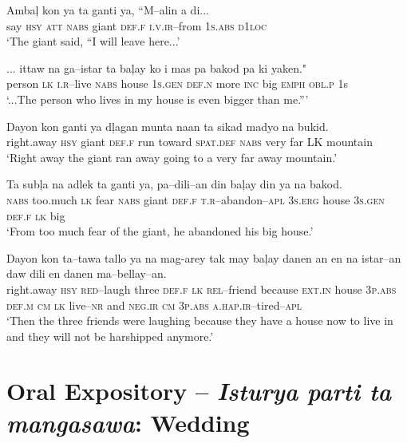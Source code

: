 \ea
\gll  Amba\c{l}  kon  ya  ta  ganti  ya,  ``M--alin  a  di... \\
say  \textsc{hsy}  \textsc{att}  \textsc{nabs}  giant  \textsc{def.f}  \textsc{i.v.ir}--from  1\textsc{s.abs}  \textsc{d1loc} \\
\glt ‘The giant said, “I will leave here...’
\z

\ea
\gll  ... ittaw  na  ga--istar  ta  ba\c{l}ay  ko  i  mas  pa  bakod   pa   ki  yaken." \\
{} person  \textsc{lk}  \textsc{i.r}--live  \textsc{nabs}  house  1\textsc{s.gen}  \textsc{def.n}  more  \textsc{inc}  big  \textsc{emph}
\textsc{obl.p}  1s \\
\glt ‘...The person who lives in my house is even bigger than me.”’
\z

\ea
\gll  Dayon  kon  ganti  ya  d\c{l}agan  munta  naan  ta  sikad   madyo  na  bukid. \\
right.away  \textsc{hsy}  giant  \textsc{def.f}  run  toward  \textsc{spat.def}  \textsc{nabs}  very far  LK  mountain \\
\glt ‘Right away the giant ran away going to a very far away mountain.’
\z

\ea
\gll  Ta  sub\c{l}a  na  adlek  ta  ganti  ya,  pa--dili--an   din  ba\c{l}ay  din  ya  na  bakod. \\
\textsc{nabs}  too.much  \textsc{lk}  fear  \textsc{nabs}  giant  \textsc{def.f}  \textsc{t.r}--abandon--\textsc{apl}
3\textsc{s.erg}  house  3\textsc{s.gen}  \textsc{def.f}  \textsc{lk} big \\
\glt ‘From too much fear of the giant, he abandoned his big house.’
\z

\ea
\gll  Dayon  kon  ta--tawa  tallo  ya  na  mag-arey  tak   may  ba\c{l}ay  danen  an  en  na  istar--an  daw  dili  en   danen  ma--bellay--an. \\
right.away  \textsc{hsy}  \textsc{red}--laugh  three  \textsc{def.f}  \textsc{lk}  \textsc{rel}--friend  because
\textsc{ext.in}  house  3\textsc{p.abs}  \textsc{def.m}  \textsc{cm}  \textsc{lk}  live--\textsc{nr}  and  \textsc{neg.ir}  \textsc{cm}
3\textsc{p.abs}  \textsc{a.hap.ir}--tired--\textsc{apl} \\
\glt ‘Then the three friends were laughing because they have a house now to live in and they will not be harshipped anymore.’
\z

\setcounter{equation}{0}
\section{Oral Expository -- \textit{Isturya parti ta mangasawa}: Wedding}

